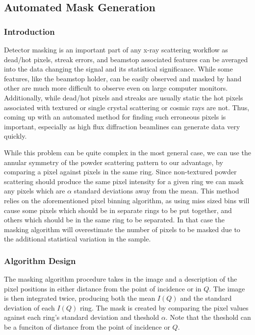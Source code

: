 \subsection{Automated Mask Generation}
\subsubsection{Introduction}
Detector masking is an important part of any x-ray scattering workflow as dead/hot pixels, streak errors, and beamstop associated features can be averaged into the data changing the signal and its statistical significance.
While some features, like the beamstop holder, can be easily observed and masked by hand other are much more difficult to observe even on large computer monitors.
Additionally, while dead/hot pixels and streaks are usually static the hot pixels associated with textured or single crystal scattering or cosmic rays are not.
Thus, coming up with an automated method for finding such erroneous pixels is important, especially as high flux diffraction beamlines can generate data very quickly.

While this problem can be quite complex in the most general case, we can use the annular symmetry of the powder scattering pattern to our advantage, by comparing a pixel against pixels in the same ring.
Since non-textured powder scattering should produce the same pixel intensity for a given ring we can mask any pixels which are $\alpha$ standard deviations away from the mean.
This method relies on the aforementioned pixel binning algorithm, as using miss sized bins will cause some pixels which should be in separate rings to be put together, and others which should be in the same ring to be separated.
In that case the masking algorithm will overestimate the number of pixels to be masked due to the additional statistical variation in the sample.

\subsubsection{Algorithm Design}
The masking algorithm procedure takes in the image and a description of the pixel positions in either distance from the point of incidence or in $Q$.
The image is then integrated twice, producing both the mean $I(Q)$ and the standard deviation of each $I(Q)$ ring.
The mask is created by comparing the pixel values against each ring's standard deviation and theshold $\alpha$.
Note that the theshold can be a funciton of distance from the point of incidence or $Q$.

